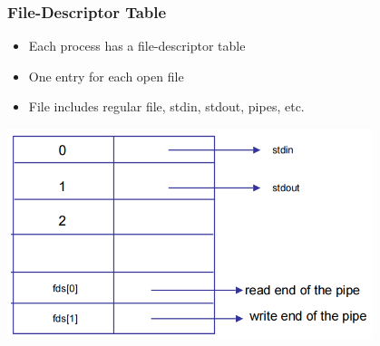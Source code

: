 \documentclass[12pt]{article}
\begin{document}
\subsubsection{File-Descriptor Table}
\begin{itemize}
    \item Each process has a file-descriptor table
    \item One entry for each open file
    \item File includes regular file, stdin, stdout, pipes, etc.
\end{itemize}
\includegraphics[width=0.8\textwidth]{FileDescriptorTable.png}
\end{document}
